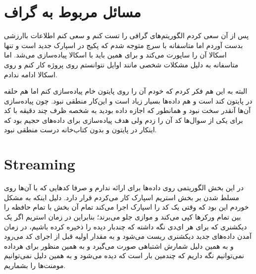 \documentclass[12pt]{article}
\begin{document}
\section*{مسائل مربوط به گراف}
پس از آن سعی کردم الگوریتم‌های گرافی را تست کنم و سعی کنم اطلاعات با‌ارزشی بدست آوردم اما متاسفانه
با سرچ متوجه شدم که پکیج
در اسپارک جدید است و تنها اسکالا آن را ساپورت می‌کند و برای همین باید با اسکالا پیاده‌سازی می‌شد.
اما متاسفانه به دلیل مشکلات شخصی مانند اوایل نتوانستم روی پروژه کار کنم و روی اسکالا ادامه ندادم.

البته به این هم فکر کردم که خودم آن را روی پایتون خام پیاده‌سازی کنم اما هم حلقه  در پایتون کند است و 
هم داده‌ها بسیار زیاد است و این‌کار منطقی نبود. چون پیاده‌سازی آن‌ها آنقدر سخت نبود و همانطور که اجازه داده بودید به شخصه ظرف چند دقیقه با کد برای یکی از سوال‌ها کد آن را زدم ولی هدف پیاده‌سازی برای داده‌های حجیم بود که اینکار در پایتون و بدون کتاب‌خانه درست منطقی نبود.

\section*{Streaming}
در این بخش الگوریتمی روی داده‌ها برای ارائه ندارم و صرفا کد‌هایی که با آن‌ها روی مسلط شدن بر بخش استریم اسپارک کار می‌کردم قرار دارد.
دلیل اینکه به مشکل خوردم این بود که وقتی یک کد را اسپارک اجرا می‌کند تمام آن بخش با تمام حافظه را بین تمام ورکر‌ها کپی می‌کند و موازی جلو می‌برند؛ بنابراین
در زمان استریم اگر یک دیکشنری که برای هر ای‌دی نگه داشته که چند‌بار دیده را ذخیره کرده باشیم، در زمان آمدن داده‌های جدید دیکشنری ریست می‌شود و به مقدار اولیه قبل از اجرای کد می‌رود و به همین دلیل شمارش اشتباهی صورت می‌گیرد و به همین منظور برای هر‌داده نمی‌توانیم نگه داریم که چندمین بار است که دیده می‌شود و به همین دلیل نمی‌توانیم مومنت‌ها را بشماریم.
\end{document}
